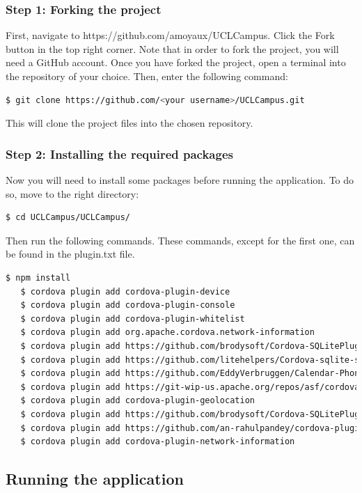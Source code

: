 \documentclass{eplmastersthesis}
\begin{document}
\subsubsection{Step 1: Forking the project}
First, navigate to https://github.com/amoyaux/UCLCampus. Click the Fork button in the top right corner. Note that in order to fork the project, you will need a GitHub account.
Once you have forked the project, open a terminal into the repository of your choice. Then, enter the following command:
\begin{lstlisting}[language=bash]
   $ git clone https://github.com/<your username>/UCLCampus.git
\end{lstlisting}

This will clone the project files into the chosen repository.

\subsubsection{Step 2: Installing the required packages}

Now you will need to install some packages before running the application. To do so, move to the right directory:

\begin{lstlisting}[language=bash]
   $ cd UCLCampus/UCLCampus/
\end{lstlisting}
Then run the following commands. These commands, except for the first one, can be found in the plugin.txt file.
\begin{lstlisting}[language=bash]
   $ npm install
   $ cordova plugin add cordova-plugin-device
   $ cordova plugin add cordova-plugin-console
   $ cordova plugin add cordova-plugin-whitelist
   $ cordova plugin add org.apache.cordova.network-information
   $ cordova plugin add https://github.com/brodysoft/Cordova-SQLitePlugin.git
   $ cordova plugin add https://github.com/litehelpers/Cordova-sqlite-storage.git
   $ cordova plugin add https://github.com/EddyVerbruggen/Calendar-PhoneGap-Plugin.git
   $ cordova plugin add https://git-wip-us.apache.org/repos/asf/cordova-plugin-inappbrowser.git
   $ cordova plugin add cordova-plugin-geolocation
   $ cordova plugin add https://github.com/brodysoft/Cordova-SQLitePlugin.git
   $ cordova plugin add https://github.com/an-rahulpandey/cordova-plugin-dbcopy.git
   $ cordova plugin add cordova-plugin-network-information
\end{lstlisting}

\subsection{Running the application}
\end{document}
